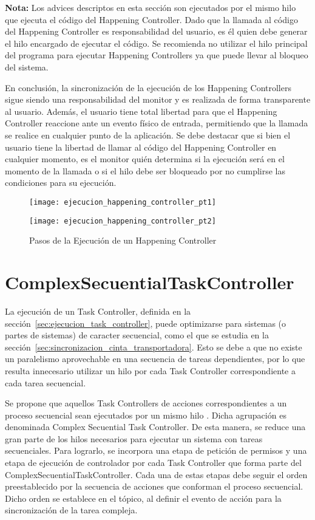 \begin{framed}
\textbf{Nota:} Los advices descriptos en esta sección son ejecutados por el
mismo hilo que ejecuta el código del Happening Controller. Dado que la llamada
al código del Happening Controller es responsabilidad del usuario, es él quien
debe generar el hilo encargado de ejecutar el código. Se recomienda no utilizar
el hilo principal del programa para ejecutar Happening Controllers ya que puede
llevar al bloqueo del sistema.
\end{framed}

En conclusión, la sincronización de la ejecución de los Happening Controllers
sigue siendo una responsabilidad del monitor y es realizada de forma
transparente al usuario. Además, el usuario tiene total libertad para que el
Happening Controller reaccione ante un evento físico de entrada, permitiendo
que la llamada se realice en cualquier punto de la aplicación. Se debe destacar
que si bien el usuario tiene la libertad de llamar al código del Happening
Controller en cualquier momento, es el monitor quién determina si la
ejecución será en el momento de la llamada o si el hilo debe ser
bloqueado por no cumplirse las condiciones para su ejecución.

\begin{figure}[H]
	\centering
	\texttt{[image: ejecucion\_happening\_controller\_pt1]}
\end{figure}
\begin{figure}[H]
	\centering
	\texttt{[image: ejecucion\_happening\_controller\_pt2]}
	\caption{Pasos de la Ejecución de un Happening Controller}
	\label{fig:ejecucion_happening_controller}
\end{figure}

\section{ComplexSecuentialTaskController}
\label{sec:complex_secuential_task_controller}
La ejecución de un Task Controller, definida en la
sección~\ref{sec:ejecucion_task_controller}, puede optimizarse para sistemas (o
partes de sistemas) de caracter secuencial, como el que se estudia en la
sección~\ref{sec:sincronizacion_cinta_transportadora}.
Esto se debe a que no existe un paralelismo aprovechable en una secuencia de
tareas dependientes, por lo que resulta innecesario utilizar un hilo
por cada Task Controller correspondiente a cada tarea secuencial.

Se propone que aquellos Task Controllers de acciones
correspondientes a un proceso secuencial sean ejecutados por un mismo hilo .
Dicha agrupación es denominada Complex Secuential Task Controller. De esta
manera, se reduce una gran parte de los hilos necesarios para ejecutar un
sistema con tareas secuenciales.
Para lograrlo, se incorpora una etapa de petición de permisos y una etapa de
ejecución de controlador por cada Task Controller que forma parte del
ComplexSecuentialTaskController. Cada una de estas etapas debe seguir el orden
preestablecido por la secuencia de acciones que conforman el proceso secuencial.
Dicho orden se establece en el tópico, al definir el evento de acción para la
sincronización de la tarea compleja.

